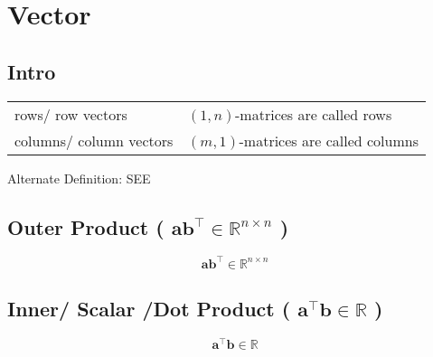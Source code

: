 \chapter{Vector \cite{mfml-1}}\label{chapter: Vector}

\section*{Intro \cite{mfml-1}}
\begin{table}[H]
    \begin{tabular}{l l}
        rows/ row vectors & $(1, n)$-matrices are called rows \\

        columns/ column vectors & $(m, 1)$-matrices are called columns \\
    \end{tabular}
\end{table}

Alternate Definition: SEE 


\section{Outer Product ( $\mathbf{ab^\top} \in \mathbb{R}^{n\times n}$ ) \cite{mfml-1}} \label{vector: Outer Product}
\[
    \mathbf{ab^\top} \in \mathbb{R}^{n\times n}
\]

\section{Inner/ Scalar /Dot Product ( $\mathbf{a^\top b} \in \mathbb{R}$ ) \cite{mfml-1}} \label{vector: Inner/ Scalar /Dot Product}
\[
    \mathbf{a^\top b} \in \mathbb{R}
\]




























































